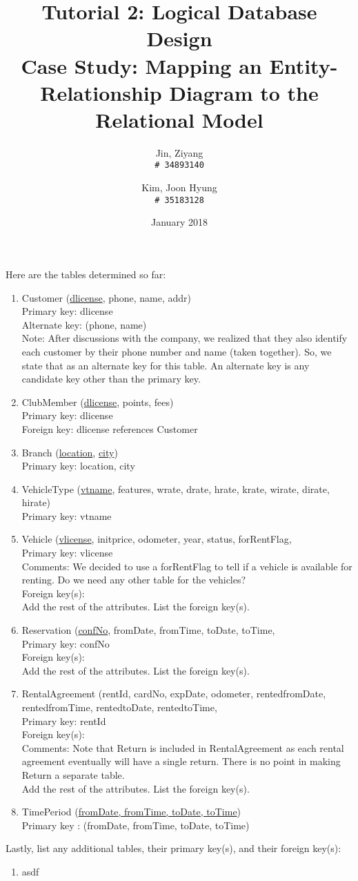 \documentclass{article}
\title{%
	Tutorial 2: Logical Database Design \\
	\large Case Study: Mapping an Entity-Relationship Diagram to the Relational Model}
\author{
	Jin, Ziyang\\
	\texttt{\# 34893140}
	\and
	Kim, Joon Hyung\\
	\texttt{\# 35183128}
}
\date{January 2018}
\begin{document}
	\maketitle
	Here are the tables determined so far:
	\begin{enumerate}
		\item Customer (\underline{dlicense}, phone, name, addr) \\ 
			Primary key: dlicense \\ 
			Alternate key: (phone, name)\\ 
			Note: After discussions with the company, we realized that they also identify each customer by their 				phone number and name (taken together). So, we state that as an alternate key for this table. An 				alternate key is any candidate key other than the primary key.
		\item ClubMember (\underline{dlicense}, points, fees)\\
			Primary key: dlicense \\
			Foreign key: dlicense references Customer
		\item Branch (\underline{location}, \underline{city}) \\
			Primary key: location, city
		\item VehicleType (\underline{vtname}, features, wrate, drate, hrate, krate, wirate, dirate, hirate) \\
			Primary key: vtname
		\item Vehicle (\underline{vlicense}, initprice, odometer, year, status, forRentFlag, \\
			Primary key: vlicense \\
			Comments: We decided to use a forRentFlag to tell if a vehicle is available for renting. Do we
					need any other table for the vehicles? \\
			Foreign key(s): \\
			Add the rest of the attributes. List the foreign key(s).
		\item Reservation (\underline{confNo}, fromDate, fromTime, toDate, toTime, \\
			Primary key: confNo \\
			Foreign key(s): \\
			Add the rest of the attributes. List the foreign key(s).
		\item RentalAgreement (rentId, cardNo, expDate, odometer, rentedfromDate, rentedfromTime,
			rentedtoDate, rentedtoTime, \\
			Primary key: rentId \\
			Foreign key(s): \\
			Comments: Note that Return is included in RentalAgreement as each rental agreement
			eventually will have a single return. There is no point in making Return a separate table. \\
			Add the rest of the attributes. List the foreign key(s).
		\item TimePeriod (\underline{fromDate, fromTime, toDate, toTime}) \\
			Primary key : (fromDate, fromTime, toDate, toTime)
	\end{enumerate}
	Lastly, list any additional tables, their primary key(s), and their foreign key(s):
	\begin{enumerate}
		\item asdf
	\end{enumerate}
	
\end{document}
